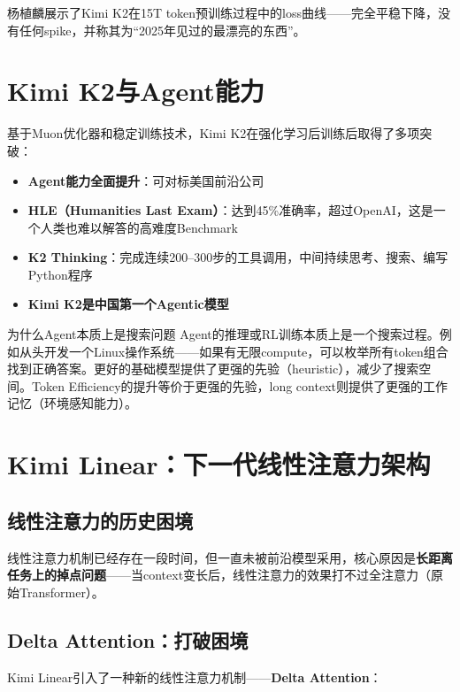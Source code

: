 \documentclass[a4paper]{article}
\begin{document}
杨植麟展示了Kimi K2在15T token预训练过程中的loss曲线——完全平稳下降，没有任何spike，并称其为``2025年见过的最漂亮的东西''。


\section{Kimi K2与Agent能力}

基于Muon优化器和稳定训练技术，Kimi K2在强化学习后训练后取得了多项突破：

\begin{itemize}
\item \textbf{Agent能力全面提升}：可对标美国前沿公司
\item \textbf{HLE（Humanities Last Exam）}：达到45\%准确率，超过OpenAI，这是一个人类也难以解答的高难度Benchmark
\item \textbf{K2 Thinking}：完成连续200--300步的工具调用，中间持续思考、搜索、编写Python程序
\item \textbf{Kimi K2是中国第一个Agentic模型}
\end{itemize}

\begin{knowledgebox}{为什么Agent本质上是搜索问题}
Agent的推理或RL训练本质上是一个搜索过程。例如从头开发一个Linux操作系统——如果有无限compute，可以枚举所有token组合找到正确答案。更好的基础模型提供了更强的先验（heuristic），减少了搜索空间。Token Efficiency的提升等价于更强的先验，long context则提供了更强的工作记忆（环境感知能力）。
\end{knowledgebox}


\section{Kimi Linear：下一代线性注意力架构}

\subsection{线性注意力的历史困境}

线性注意力机制已经存在一段时间，但一直未被前沿模型采用，核心原因是\textbf{长距离任务上的掉点问题}——当context变长后，线性注意力的效果打不过全注意力（原始Transformer）。

\subsection{Delta Attention：打破困境}

Kimi Linear引入了一种新的线性注意力机制——\textbf{Delta Attention}：
\end{document}
